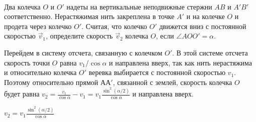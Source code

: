 \begin{ex}
\hspace{0pt} \\
\begin{minipage}{.65\textwidth}
Два колечка $O$ и $O'$ надеты на вертикальные неподвижные стержни $AB$ и $A'B'$ соответственно. Нерастяжимая нить закреплена в точке $A'$ и на колечке $O$ и продета через  колечко $O'$. 
Считая, что колечко $O'$ движется вниз с постоянной скоростью $\vec{v}_1$, определите скорость $\vec{v}_2$ колечка $O$, если  $\angle AOO' = \alpha$.
\end{minipage}
\begin{minipage}{.35\textwidth}
\centering

\end{minipage}
\begin{sol}
Перейдем в систему отсчета, связанную с колечком $O'$. В этой системе отсчета скорость точки $O$ равна $v_1/ \cos \alpha$ и направлена вверх, так как нить нерастяжима и относительно колечка $O'$ веревка выбирается с постоянной скоростью $v_1$. Поэтому относительно прямой $АА'$, связанной с землей, скорость колечка $O$ будет равна $v_2 = \frac{v_1}{\cos \alpha} - v_1 = v_1 \frac{\sin^2 (\alpha /2)}{\cos \alpha}$ и направлена вверх.
\end{sol}
\begin{ans}
$v_2 = v_1 \frac{\sin^2 (\alpha /2)}{\cos \alpha}$
\end{ans}
\end{ex}

